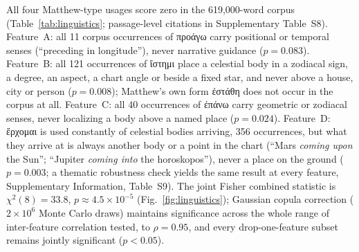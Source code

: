 \documentclass[sn-nature]{sn-jnl}
\newcommand{\grk}[1]{{\fontencoding{LGR}\selectfont #1}}
\newcommand{\grk}[1]{{\greekfont #1}}
\begin{document}
All four Matthew-type usages score zero in the 619,000-word corpus
(Table~\ref{tab:linguistics}; passage-level citations in Supplementary
Table~S8). Feature~A: all 11 corpus occurrences of \grk{προάγω} carry
positional or temporal senses (``preceding in longitude''), never narrative
guidance ($p = 0.083$). Feature~B: all 121 occurrences of \grk{ἵστημι} place
a celestial body in a zodiacal sign, a degree, an aspect, a chart angle or
beside a fixed star, and never above a house, city or person ($p = 0.008$);
Matthew's own form \grk{ἐστάθη} does not occur in the corpus at all.
Feature~C: all 40 occurrences of \grk{ἐπάνω}
carry geometric or zodiacal senses, never localizing a body above a named
place ($p = 0.024$). Feature~D: \grk{ἔρχομαι} is used constantly of celestial
bodies arriving, 356 occurrences, but what they arrive at is always another
body or a point in the chart (``Mars \emph{coming upon} the Sun''; ``Jupiter
\emph{coming into} the horoskopos''), never a place on the ground
($p = 0.003$; a thematic robustness check yields the same result at every
feature, Supplementary Information, Table~S9). The joint Fisher combined
statistic is $\chi^2(8)=33.8$, $p \approx 4.5\times10^{-5}$
(Fig.~\ref{fig:linguistics}); Gaussian copula correction
($2\times10^6$ Monte Carlo draws) maintains significance across the whole
range of inter-feature correlation tested, to $\rho = 0.95$, and every
drop-one-feature subset remains jointly significant ($p < 0.05$).
\end{document}
